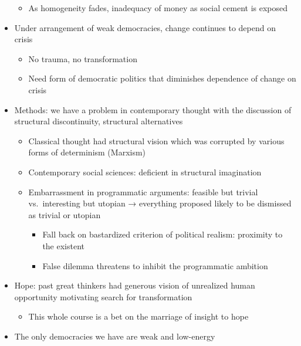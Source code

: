 \begin{itemize}
  \begin{itemize}
  \tightlist
  \item
    As homogeneity fades, inadequacy of money as social cement is
    exposed
  \end{itemize}
\item
  Under arrangement of weak democracies, change continues to depend on
  crisis

  \begin{itemize}
  \tightlist
  \item
    No trauma, no transformation
  \item
    Need form of democratic politics that diminishes dependence of
    change on crisis
  \end{itemize}
\item
  Methods: we have a problem in contemporary thought with the discussion
  of structural discontinuity, structural alternatives

  \begin{itemize}
  \tightlist
  \item
    Classical thought had structural vision which was corrupted by
    various forms of determinism (Marxism)
  \item
    Contemporary social sciences: deficient in structural imagination
  \item
    Embarrassment in programmatic arguments: feasible but trivial
    vs.~interesting but utopian → everything proposed likely to be
    dismissed as trivial or utopian

    \begin{itemize}
    \tightlist
    \item
      Fall back on bastardized criterion of political realism: proximity
      to the existent
    \item
      False dilemma threatens to inhibit the programmatic ambition
    \end{itemize}
  \end{itemize}
\item
  Hope: past great thinkers had generous vision of unrealized human
  opportunity motivating search for transformation

  \begin{itemize}
  \tightlist
  \item
    This whole course is a bet on the marriage of insight to hope
  \end{itemize}
\item
  The only democracies we have are weak and low-energy


\end{itemize}
